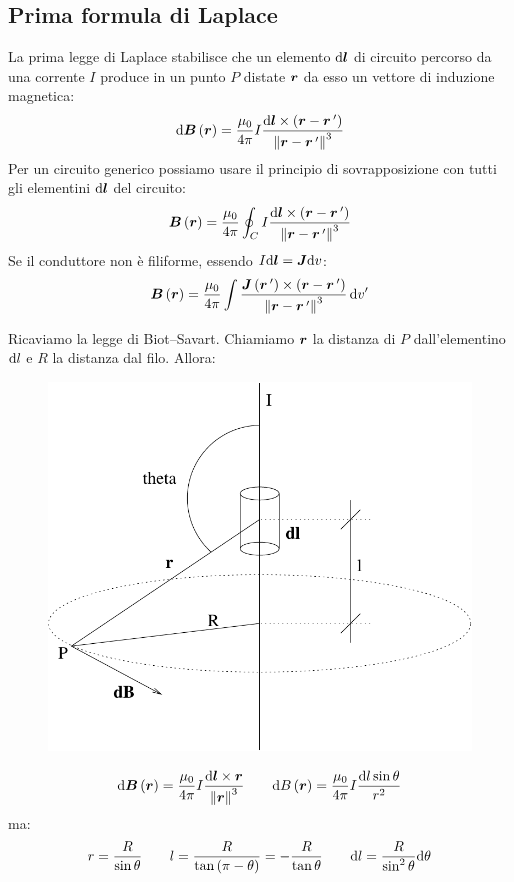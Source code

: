 \subsection{Prima formula di Laplace}
La prima legge di Laplace stabilisce che un elemento $\mathrm{d} \boldsymbol{l}$ di circuito percorso da una corrente $I$ produce in un punto $P$ distate $\boldsymbol{r}$ da esso un vettore di induzione magnetica:
\begin{equation}
  \mathrm{d}\boldsymbol{B}\left(\boldsymbol{r}\right)=\frac{\mu_0}{4\pi}I\frac{\mathrm{d}\boldsymbol{l}\times\left(\boldsymbol{r}-\boldsymbol{r}\,'\right)}{\left\lVert\boldsymbol{r}-\boldsymbol{r}\,'\right\rVert^3}
\end{equation}
Per un circuito generico possiamo usare il principio di sovrapposizione con tutti gli elementini $\mathrm{d}\boldsymbol{l}$  del circuito:
\begin{equation}
  \boldsymbol{B}\left(\boldsymbol{r}\right)=\frac{\mu_0}{4\pi}\oint_C I\frac{\mathrm{d}\boldsymbol{l}\times\left(\boldsymbol{r}-\boldsymbol{r}\,'\right)}{\left\lVert\boldsymbol{r}-\boldsymbol{r}\,'\right\rVert^3}
  \label{campo_spira_laplace}
\end{equation}
Se il conduttore non è filiforme, essendo $I\mathrm{d} \boldsymbol{l}=\boldsymbol{J}\mathrm{d} v$:
\begin{equation}
  \boldsymbol{B}\left(\boldsymbol{r}\right)=\frac{\mu_0}{4\pi}\int\frac{\boldsymbol{J}\left(\boldsymbol{r}\,'\right)\times\left(\boldsymbol{r}-\boldsymbol{r}\,'\right)}{\left\lVert\boldsymbol{r}-\boldsymbol{r}\,'\right\rVert^3}\,\mathrm{d} v'
\end{equation}
\begin{Es}
  \label{Es:filo_infinito}
  Ricaviamo la legge di Biot--Savart. Chiamiamo $\boldsymbol{r}$ la distanza di $P$ dall'elementino $\mathrm{d} l$ e $R$ la distanza dal filo. Allora:
  \begin{figure}[htbp]
    \centering
    \includegraphics[scale=0.5]{immagini/fisica2/magneto_filo}
  \end{figure}
  \[\mathrm{d} \boldsymbol{B}\left(\boldsymbol{r}\right)=\frac{\mu_0}{4\pi}I\frac{\mathrm{d}\boldsymbol{l}\times\boldsymbol{r}}{\left\lVert\boldsymbol{r}\right\rVert^3}\qquad\mathrm{d} B\left(\boldsymbol{r}\right)=\frac{\mu_0}{4\pi}I\frac{\mathrm{d} l\sin\theta}{r^2}\]
  ma:
  \[r=\frac{R}{\sin\theta}\qquad l=\frac{R}{\tan\left(\pi-\theta\right)}=-\frac{R}{\tan\theta}\qquad \mathrm{d} l=\frac{R}{\sin^2\theta}\mathrm{d}\theta\]
\end{Es}
